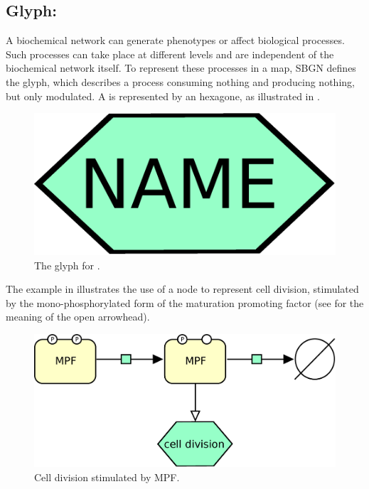 \subsection{Glyph: }
\label{sec:phenotype}

A biochemical network can generate phenotypes or affect biological
processes.  Such processes can take place at different levels and are
independent of the biochemical network itself.  To represent these
processes in a map, SBGN defines the  glyph, which describes a process consuming nothing and producing nothing, but only modulated. A  is represented by an hexagone, as illustrated in . 

\begin{figure}[H]
  \centering
  \includegraphics[scale = 0.3]{images/phenotype}
  \caption{The \PD glyph for .}
  \label{fig:phenotype}
\end{figure}

The example in  illustrates the use of a  node to represent cell division, stimulated by the mono-phosphorylated form of the maturation promoting factor (see  for the meaning of the open arrowhead). 

\begin{figure}[H]
  \centering
  \includegraphics[scale = 0.5]{images/phenotype-MPF}
  \caption{Cell division stimulated by MPF.}
  \label{fig:phenotype-MPF}
\end{figure}
